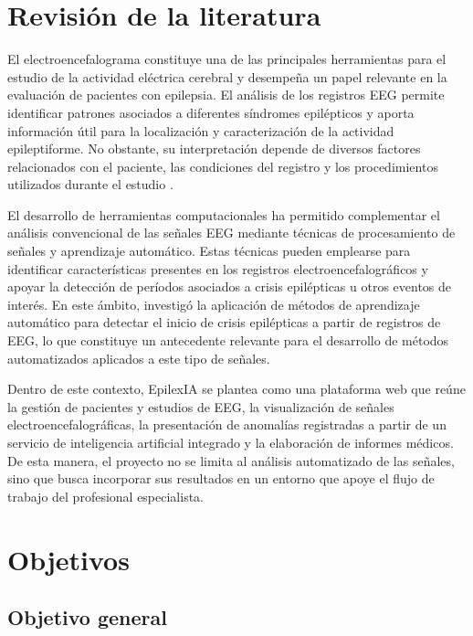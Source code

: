 \section{Revisión de la literatura}
\label{sec:revision-literatura}

El electroencefalograma constituye una de las principales herramientas para el estudio de la actividad eléctrica cerebral y desempeña un papel relevante en la evaluación de pacientes con epilepsia. El análisis de los registros EEG permite identificar patrones asociados a diferentes síndromes epilépticos y aporta información útil para la localización y caracterización de la actividad epileptiforme. No obstante, su interpretación depende de diversos factores relacionados con el paciente, las condiciones del registro y los procedimientos utilizados durante el estudio \citep{NoachtarRemi2009}.

El desarrollo de herramientas computacionales ha permitido complementar el análisis convencional de las señales EEG mediante técnicas de procesamiento de señales y aprendizaje automático. Estas técnicas pueden emplearse para identificar características presentes en los registros electroencefalográficos y apoyar la detección de períodos asociados a crisis epilépticas u otros eventos de interés. En este ámbito, \citet{Shoeb2009} investigó la aplicación de métodos de aprendizaje automático para detectar el inicio de crisis epilépticas a partir de registros de EEG, lo que constituye un antecedente relevante para el desarrollo de métodos automatizados aplicados a este tipo de señales.

Dentro de este contexto, EpilexIA se plantea como una plataforma web que reúne la gestión de pacientes y estudios de EEG, la visualización de señales electroencefalográficas, la presentación de anomalías registradas a partir de un servicio de inteligencia artificial integrado y la elaboración de informes médicos. De esta manera, el proyecto no se limita al análisis automatizado de las señales, sino que busca incorporar sus resultados en un entorno que apoye el flujo de trabajo del profesional especialista.

\section{Objetivos}
\label{sec:objetivos}

\subsection{Objetivo general}
\label{subsec:objetivo-general}

